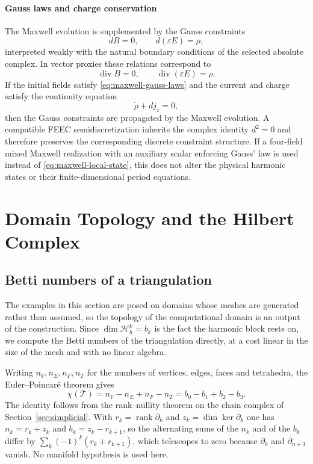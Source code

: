 \documentclass{article}
\DeclareMathOperator{\divergence}{div}
\begin{document}
\paragraph{Gauss laws and charge conservation}

The Maxwell evolution is supplemented by the Gauss constraints
\begin{equation}
  dB=0,
  \qquad
  d(\varepsilon E)=\rho,
  \label{eq:maxwell-gauss-laws}
\end{equation}
interpreted weakly with the natural boundary conditions of the selected
absolute complex. In vector proxies these relations correspond to
\[
  \divergence B=0,
  \qquad
  \divergence(\varepsilon E)=\rho.
\]
If the initial fields satisfy \eqref{eq:maxwell-gauss-laws} and the
current and charge satisfy the continuity equation
\begin{equation}
  \dot\rho+d j_z=0,
\end{equation}
then the Gauss constraints are propagated by the Maxwell evolution.
A compatible FEEC semidiscretization inherits the complex identity
$d^2=0$ and therefore preserves the corresponding discrete constraint
structure. If a four-field mixed Maxwell realization with an auxiliary
scalar enforcing Gauss' law is used instead of
\eqref{eq:maxwell-local-state}, this does not alter the physical
harmonic states or their finite-dimensional period equations.


\section{Domain Topology and the Hilbert Complex}

\subsection{Betti numbers of a triangulation}
\label{sec:betti}
 
The examples in this section are posed on domains whose
meshes are generated rather than assumed, so the topology of the
computational domain is an output of the construction. Since
$\dim\mathcal{H}^{k}_{h}=b_{k}$ is the fact the harmonic block rests
on, we compute the Betti numbers of the triangulation directly, at a
cost linear in the size of the mesh and with no linear algebra.
 
Writing $n_{V},n_{E},n_{F},n_{T}$ for the numbers of vertices, edges,
faces and tetrahedra, the Euler--Poincar\'e theorem gives
\begin{equation}\label{eq:euler}
  \chi(\mathcal{T})=n_{V}-n_{E}+n_{F}-n_{T}
  =b_{0}-b_{1}+b_{2}-b_{3}.
\end{equation}
The identity follows from the rank–nullity theorem on the chain complex of
Section~\ref{sec:simplicial}. With
$r_{k}=\operatorname{rank}\partial_{k}$ and
$z_{k}=\dim\ker\partial_{k}$ one has $n_{k}=r_{k}+z_{k}$ and
$b_{k}=z_{k}-r_{k+1}$, so the alternating sums of the $n_{k}$ and of
the $b_{k}$ differ by $\sum_{k}(-1)^{k}(r_{k}+r_{k+1})$, which
telescopes to zero because $\partial_{0}$ and $\partial_{n+1}$ vanish.
No manifold hypothesis is used here.
 
\end{document}

